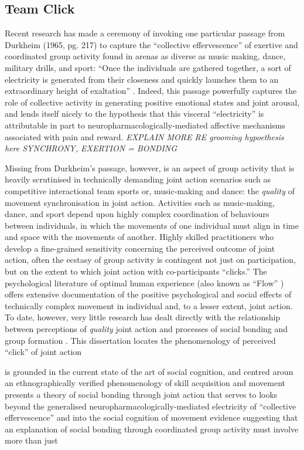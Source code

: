 \subsection{Team Click}
Recent research has made a ceremony of invoking one particular passage from Durkheim (1965, pg. 217) to capture the ``collective effervescence'' of exertive and coordinated group activity found in arenas as diverse as music making, dance, military drills, and sport:  ``Once the individuals are gathered together, a sort of electricity is generated from their closeness and quickly launches them to an extraordinary height of exaltation'' \citep{McNeill1995,Konvalinka2011,Fischer2014,Mogan2017}. Indeed, this passage powerfully captures the role of collective activity in generating positive emotional states and joint arousal, and lends itself nicely to the hypothesis that this visceral ``electricity'' is attributable in part to neuropharmacologically-mediated affective mechanisms associated with pain and reward\citep{Dunbar2008,Cohen2009,Fischer2014,Launay2016}.   \textit{EXPLAIN MORE RE grooming hypoethesis here  SYNCHRONY, EXERTION = BONDING}

Missing from Durkheim's passage, however, is an aspect of group activity that is heavily scrutinised in
technically demanding joint action scenarios such as competitive interactional team sports or, music-making and dance: the \textit{quality} of movement synchronisation in joint action.  Activities such as music-making, dance, and sport depend upon highly complex coordination of behaviours between individuals, in which the movements of one individual must align in time and space with the movements of another.  Highly skilled practitioners who develop a fine-grained sensitivity concerning the perceived outcome of joint action, often the ecstasy of group activity is contingent not just on participation, but on the extent to which joint action with co-participants ``clicks.''   The psychological literature of optimal human experience (also known as ``Flow'' \citep{Csikszentmihalyi1992}) offers extensive documentation of the positive psychological and social effects of technically complex movement in individual and, to a lesser extent, joint action. To date, however, very little research has dealt directly with the relationship between perceptions of \textit{quality} joint action and processes of social bonding and group formation \citep[but see][]{Marsh2009}.
This dissertation locates the phenomenology of perceived ``click'' of joint action

is grounded in the current state of the art of social cognition, and centred aroun
an ethnographically verified phenomenology of skill acquisition and movement
presents a theory of social bonding through joint action that serves to
 looks beyond the generalised neuropharmacologically-mediated electricity of  ``collective effervescence'' and into the social cognition of movement
evidence suggesting that an explanation of social bonding through coordinated group activity must involve more than just



